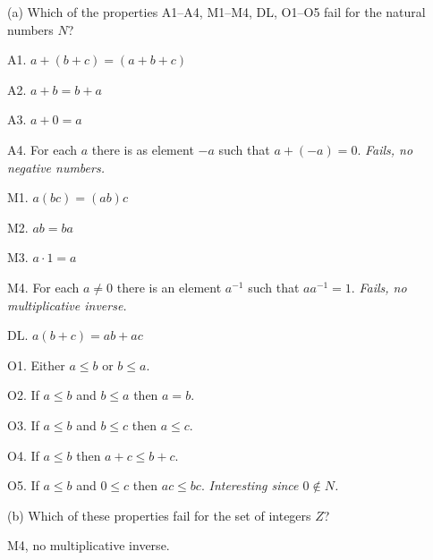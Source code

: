 
(a) Which of the properties A1--A4, M1--M4, DL, O1--O5 fail for the
natural numbers $N$?

\medskip
A1. $a+(b+c)=(a+b+c)$

A2. $a+b=b+a$

A3. $a+0=a$

A4. For each $a$ there is as element $-a$ such that $a+(-a)=0$.
{\it Fails, no negative numbers.}

M1. $a(bc)=(ab)c$

M2. $ab=ba$

M3. $a\cdot1=a$

M4. For each $a\ne0$ there is an element $a^{-1}$ such that $aa^{-1}=1$.
{\it Fails, no multiplicative inverse.}

DL. $a(b+c)=ab+ac$

O1. Either $a\le b$ or $b\le a$.

O2. If $a\le b$ and $b\le a$ then $a=b$.

O3. If $a\le b$ and $b\le c$ then $a\le c$.

O4. If $a\le b$ then $a+c\le b+c$.

O5. If $a\le b$ and $0\le c$ then $ac\le bc$.
{\it Interesting since $0\not\in N$.}

\medskip
(b) Which of these properties fail for the set of integers $Z$?

\medskip
M4, no multiplicative inverse.

